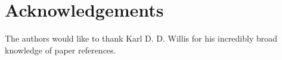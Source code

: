 \section{Acknowledgements}
The authors would like to thank Karl D. D. Willis for his incredibly broad knowledge of paper references.